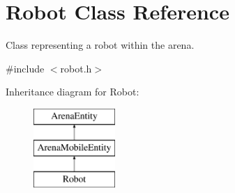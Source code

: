\hypertarget{class_robot}{}\section{Robot Class Reference}
\label{class_robot}


Class representing a robot within the arena.  




{\ttfamily \#include $<$robot.\+h$>$}

Inheritance diagram for Robot\+:\begin{figure}[H]
\begin{center}
\leavevmode
\includegraphics[height=3.000000cm]{class_robot}
\end{center}
\end{figure}
